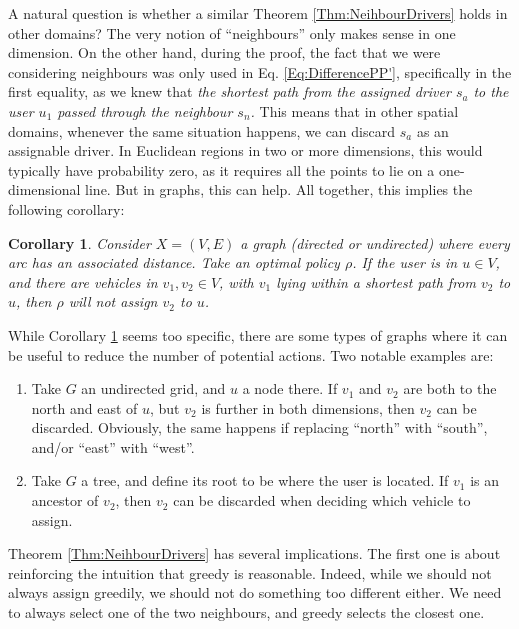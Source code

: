 \documentclass[12pt,english]{article}
\newtheorem{corollary}{Corollary}
\begin{document}
{A natural question is whether a similar Theorem \ref{Thm:NeihbourDrivers} holds in other domains? The very notion of ``neighbours'' only makes sense in one dimension. On the other hand, during the proof, the fact that we were considering neighbours was only used in Eq. \eqref{Eq:DifferencePP'}, specifically in the first equality, as we knew that \textit{the shortest path from the assigned driver $s_a$ to the user $u_1$ passed through the neighbour $s_n$.} This means that in other spatial domains, whenever the same situation happens, we can discard $s_a$ as an assignable driver. In Euclidean regions in two or more dimensions, this would typically have probability zero, as it requires all the points to lie on a one-dimensional line. But in graphs, this can help. All together, this implies the following corollary:

\begin{corollary}\label{Cor1}
Consider $X=(V,E)$ a graph (directed or undirected) where every arc has an associated distance. Take an optimal policy $\rho$. If the user is in $u \in V$, and there are vehicles in $v_1, v_2 \in V$, with $v_1$ lying within a shortest path from $v_2$ to $u$, then $\rho$ will not assign $v_2$ to $u$.
\end{corollary}

While Corollary \ref{Cor1} seems too specific, there are some types of graphs where it can be useful to reduce the number of potential actions. Two notable examples are:

\begin{enumerate}
    \item Take $G$ an undirected grid, and $u$ a node there. If $v_1$ and $v_2$ are both to the north and east of $u$, but $v_2$ is further in both dimensions, then $v_2$ can be discarded. Obviously, the same happens if replacing ``north'' with ``south'', and/or ``east'' with ``west''.
    \item Take $G$ a tree, and define its root to be where the user is located. If $v_1$ is an ancestor of $v_2$, then $v_2$ can be discarded when deciding which vehicle to assign.
\end{enumerate}

Theorem \ref{Thm:NeihbourDrivers} has several implications. The first one is about reinforcing the intuition that greedy is reasonable. Indeed, while we should not always assign greedily, we should not do something too different either. We need to always select one of the two neighbours, and greedy selects the closest one. 

}
\end{document}
